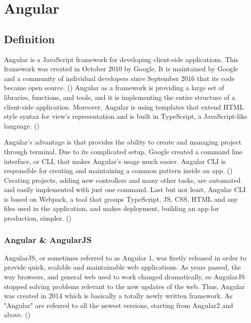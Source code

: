 
\chapter{Angular} %

\label{Chapter4} %

\section{Definition}

Angular is a JavaScript framework for developing client-side applications. This framework was created in October 2010 by Google. It is maintained by Google and a community of individual developers since September 2016 that its code became open source. (\cite{Reference6}) Angular as a framework is providing a large set of libraries, functions, and tools, and it is implementing the entire structure of a client-side application. Moreover, Angular is using templates that extend HTML style syntax for view's representation and is built in TypeScript, a JavaScript-like language. (\cite{Reference19}) \par

Angular's advantage is that provides the ability to create and managing project through terminal. Due to its complicated setup, Google created a command line interface, or CLI, that makes Angular's usage much easier. Angular CLI is responsible for creating and maintaining a common pattern inside an app. (\cite{angularUpandRunning}) Creating projects, adding new controllers and many other tasks, are automated and easily implemented with just one command. Last but not least, Angular CLI is based on Webpack, a tool that groups TypeScript, JS, CSS, HTML and any files used in the application, and makes deployment, building an app for production, simpler. (\cite{murray2018ng}) \par

\subsection{Angular \& AngularJS}

AngularJS, or sometimes referred to as Angular 1, was firstly released in order to provide quick, scalable and maintainable web applications. As years passed, the way browsers, and general web used to work changed dramatically, so AngularJS stopped solving problems relevant to the new updates of the web. Thus, Angular was created in 2014 which is basically a totally newly written framework. As "Angular" are referred to all the newest versions, starting from Angular2 and above. (\cite{angularUpandRunning}) \par

